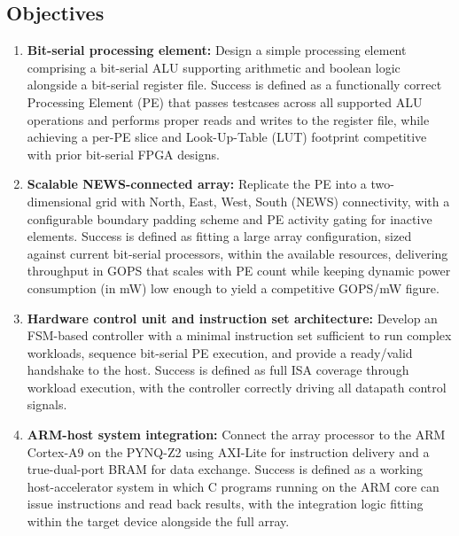 \begin{uomappendix}
    \subsection{Objectives}
    
    \begin{enumerate}
        
        \item \textbf{Bit-serial processing element:}\label{item:obj1} Design a simple processing element comprising a bit-serial ALU supporting arithmetic and boolean logic alongside a bit-serial register file. Success is defined as a functionally correct Processing Element (PE) that passes testcases across all supported ALU operations and performs proper reads and writes to the register file, while achieving a per-PE slice and Look-Up-Table (LUT) footprint competitive with prior bit-serial FPGA designs.
        
        \item \textbf{Scalable NEWS-connected array:}\label{item:obj2} Replicate the PE into a two-dimensional grid with North, East, West, South (NEWS) connectivity, with a configurable boundary padding scheme and PE activity gating for inactive elements. Success is defined as fitting a large array configuration, sized against current bit-serial processors, within the available resources, delivering throughput in GOPS that scales with PE count while keeping dynamic power consumption (in mW) low enough to yield a competitive GOPS/mW figure.
        
        \item \textbf{Hardware control unit and instruction set architecture:}\label{item:obj3} Develop an FSM-based controller with a minimal instruction set sufficient to run complex workloads, sequence bit-serial PE execution, and provide a ready/valid handshake to the host. Success is defined as full ISA coverage through workload execution, with the controller correctly driving all datapath control signals.
        
        \item \textbf{ARM-host system integration:}\label{item:obj4} Connect the array processor to the ARM Cortex-A9 on the PYNQ-Z2 using AXI-Lite for instruction delivery and a true-dual-port BRAM for data exchange. Success is defined as a working host-accelerator system in which C programs running on the ARM core can issue instructions and read back results, with the integration logic fitting within the target device alongside the full array.
        

\end{enumerate}
\end{uomappendix}
